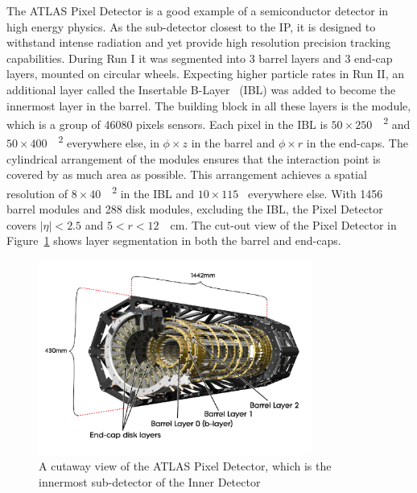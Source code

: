 \par The ATLAS Pixel Detector is a good example of a semiconductor detector in high energy physics.
As the sub-detector closest to the IP, it is designed to withstand intense radiation and yet 
provide high resolution precision tracking capabilities. During Run I it was segmented into 
3 barrel layers and 3 end-cap layers, mounted on circular wheels. Expecting higher particle 
rates in Run II, an additional layer called the Insertable B-Layer~\cite{Pohl:2013yda} (IBL) 
was added to become the innermost layer in the barrel. The building block in all these layers 
is the module, which is a group of 46080 pixels sensors. Each pixel in the IBL is     
 $50\times250$~\SI{}{\micron^2} and $50\times400$~\SI{}{\micron^2} everywhere else, 
in $\phi\times z$ in the barrel and $\phi\times r$ in the end-caps.  
The cylindrical arrangement of the modules ensures that the interaction 
point is covered by as much area as possible. This arrangement achieves a spatial 
resolution of $8\times 40$~\SI{}{\micron^2} in the IBL  and $10\times 115$~\SI{}{\micron} 
everywhere else. With 1456 barrel modules and 288 disk modules, 
excluding the IBL, the Pixel Detector covers $|\eta|<2.5$ and $5<r<12$~\SI{}{\cm}. 
The cut-out view of the Pixel Detector in Figure~\ref{fig:pixelD} shows layer segmentation
in both the barrel and end-caps. 

\begin{figure}[!h]
	\centering
   \includegraphics[width=0.8\textwidth]{figures/PixelPerspective.png}
	\caption{A cutaway view of the ATLAS Pixel Detector, which is the innermost sub-detector of the Inner Detector}
	\label{fig:pixelD}
\end{figure}

